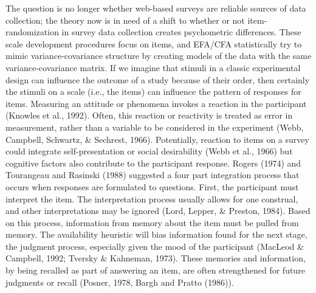 \documentclass[english,man, mask]{apa6}
\theoremstyle{definition}
\theoremstyle{definition}
\theoremstyle{definition}
\theoremstyle{remark}
\begin{document}
The question is no longer whether web-based surveys are reliable sources
of data collection; the theory now is in need of a shift to whether or
not item-randomization in survey data collection creates psychometric
differences. These scale development procedures focus on items, and
EFA/CFA statistically try to mimic variance-covariance structure by
creating models of the data with the same variance-covariance matrix. If
we imagine that stimuli in a classic experimental design can influence
the outcome of a study because of their order, then certainly the
stimuli on a scale (i.e., the items) can influence the pattern of
responses for items. Measuring an attitude or phenomena invokes a
reaction in the participant (Knowles et al., 1992). Often, this reaction
or reactivity is treated as error in measurement, rather than a variable
to be considered in the experiment (Webb, Campbell, Schwartz, \&
Sechrest, 1966). Potentially, reaction to items on a survey could
integrate self-presentation or social desirability (Webb et al., 1966)
but cognitive factors also contribute to the participant response.
Rogers (1974) and Tourangeau and Rasinski (1988) suggested a four part
integration process that occurs when responses are formulated to
questions. First, the participant must interpret the item. The
interpretation process usually allows for one construal, and other
interpretations may be ignored (Lord, Lepper, \& Preston, 1984). Based
on this process, information from memory about the item must be pulled
from memory. The availability heuristic will bias information found for
the next stage, the judgment process, especially given the mood of the
participant (MacLeod \& Campbell, 1992; Tversky \& Kahneman, 1973).
These memories and information, by being recalled as part of answering
an item, are often strengthened for future judgments or recall (Posner,
1978, Bargh and Pratto (1986)).
\end{document}
